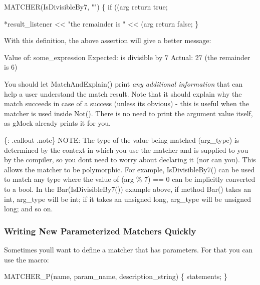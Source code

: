 \begin{DoxyCode}
MATCHER(IsDivisibleBy7, \textcolor{stringliteral}{""}) \{
  \textcolor{keywordflow}{if} ((arg %
    \textcolor{keywordflow}{return} \textcolor{keyword}{true};

  *result\_listener << \textcolor{stringliteral}{"the remainder is "} << (arg %
  \textcolor{keywordflow}{return} \textcolor{keyword}{false};
\}
\end{DoxyCode}


With this definition, the above assertion will give a better message\+:


\begin{DoxyCode}
Value of: some\_expression
Expected: is divisible by 7
  Actual: 27 (the remainder is 6)
\end{DoxyCode}


You should let {\ttfamily Match\+And\+Explain()} print {\itshape any additional information} that can help a user understand the match result. Note that it should explain why the match succeeds in case of a success (unless it\textquotesingle{}s obvious) -\/ this is useful when the matcher is used inside {\ttfamily Not()}. There is no need to print the argument value itself, as g\+Mock already prints it for you.

\{\+: .callout .note\} N\+O\+TE\+: The type of the value being matched ({\ttfamily arg\+\_\+type}) is determined by the context in which you use the matcher and is supplied to you by the compiler, so you don\textquotesingle{}t need to worry about declaring it (nor can you). This allows the matcher to be polymorphic. For example, {\ttfamily Is\+Divisible\+By7()} can be used to match any type where the value of {\ttfamily (arg \% 7) == 0} can be implicitly converted to a {\ttfamily bool}. In the {\ttfamily Bar(\+Is\+Divisible\+By7())} example above, if method {\ttfamily Bar()} takes an {\ttfamily int}, {\ttfamily arg\+\_\+type} will be {\ttfamily int}; if it takes an {\ttfamily unsigned long}, {\ttfamily arg\+\_\+type} will be {\ttfamily unsigned long}; and so on.

\subsubsection*{Writing New Parameterized Matchers Quickly}

Sometimes you\textquotesingle{}ll want to define a matcher that has parameters. For that you can use the macro\+:


\begin{DoxyCode}
MATCHER\_P(name, param\_name, description\_string) \{ statements; \}
\end{DoxyCode}


